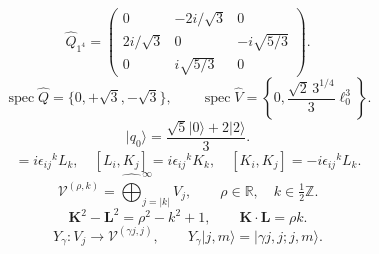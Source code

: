 \documentclass{article}
\newcommand{\ket}[1]{\lvert #1\rangle}
\begin{document}
\begin{equation}
\hat Q_{1^4}=\begin{pmatrix}0&-2i/\sqrt3&0\\2i/\sqrt3&0&-i\sqrt{5/3}\\0&i\sqrt{5/3}&0\end{pmatrix}.
\tag{L9}
\end{equation}
\begin{equation}
\operatorname{spec}\hat Q=\{0,+\sqrt3,-\sqrt3\},\qquad\operatorname{spec}\hat V=\left\{0,\frac{\sqrt2\,3^{1/4}}3\ell_0^3\right\}.
\tag{L10}
\end{equation}
\begin{equation}
\ket{q_0}=\frac{\sqrt5\ket0+2\ket2}{3}.
\tag{L11}
\end{equation}
\begin{equation}
[L_i,L_j]=i\epsilon_{ij}{}^kL_k,\quad[L_i,K_j]=i\epsilon_{ij}{}^kK_k,\quad[K_i,K_j]=-i\epsilon_{ij}{}^kL_k.
\tag{Y1}
\end{equation}
\begin{equation}
\mathcal V^{(\rho,k)}=\widehat{\bigoplus}_{j=|k|}^\infty V_j,\qquad\rho\in\mathbb R,\quad k\in\tfrac12\mathbb Z.
\tag{Y2}
\end{equation}
\begin{equation}
\mathbf K^2-\mathbf L^2=\rho^2-k^2+1,\qquad\mathbf K\cdot\mathbf L=\rho k.
\tag{Y3}
\end{equation}
\begin{equation}
Y_\gamma:V_j\longrightarrow\mathcal V^{(\gamma j,j)},\qquad Y_\gamma\ket{j,m}=\ket{\gamma j,j;j,m}.
\tag{Y4}
\end{equation}
\end{document}
